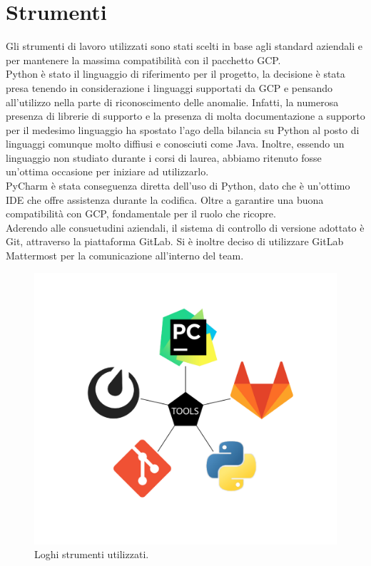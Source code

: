 \section{Strumenti}
Gli strumenti di lavoro utilizzati sono stati scelti in base agli standard aziendali e per mantenere la massima compatibilità con il pacchetto GCP.
\\
Python è stato il linguaggio di riferimento per il progetto, la decisione è stata presa tenendo in considerazione i linguaggi supportati da GCP e pensando all'utilizzo nella parte di riconoscimento delle anomalie. Infatti, la numerosa presenza di librerie di supporto e la presenza di molta documentazione a supporto per il medesimo linguaggio ha spostato l'ago della bilancia su Python al posto di linguaggi comunque molto diffiusi e conosciuti come Java. Inoltre, essendo un linguaggio non studiato durante i corsi di laurea, abbiamo ritenuto fosse un'ottima occasione per iniziare ad utilizzarlo.
\\
PyCharm è stata conseguenza diretta dell'uso di Python, dato che è un'ottimo IDE che offre assistenza durante la codifica. Oltre a garantire una buona compatibilità con GCP, fondamentale per il ruolo che ricopre.
\\
Aderendo alle consuetudini aziendali, il sistema di controllo di versione adottato è Git, attraverso la piattaforma GitLab. Si è inoltre deciso di utilizzare GitLab Mattermost per la comunicazione all'interno del team.
\begin{figure}[h!]
	\centering
	\includegraphics[scale=0.4]{figures/pentagono_grande-03}
	\caption[Loghi strumenti utilizzati	.]{Loghi strumenti utilizzati.
		\label{fig:loghi}}
\end{figure}	